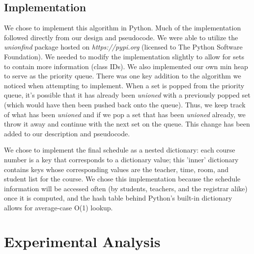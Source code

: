 \documentclass[11pt, oneside]{article}   	%
\begin{document}
\subsection{Implementation}
We chose to implement this algorithm in Python. Much of the implementation followed directly from our design and pseudocode. We were able to utilize the {\it unionfind} package hosted on {\it https://pypi.org} (licensed to The Python Software Foundation). We needed to modify the implementation slightly to allow for sets to contain more information (class IDs). We also implemented our own min heap to serve as the priority queue. There was one key addition to the algorithm we noticed when attempting to implement. When a set is popped from the priority queue, it's possible that it has already been {\it unioned} with a previously popped set (which would have then been pushed back onto the queue). Thus, we keep track of what has been {\it unioned} and if we pop a set that has been {\it unioned} already, we throw it away and continue with the next set on the queue. This change has been added to our description and pseudocode.

We chose to implement the final schedule as a nested dictionary: each course number is a key that corresponds to a dictionary value; this 'inner' dictionary contains keys whose corresponding values are the teacher, time, room, and student list for the course. We chose this implementation because the schedule information will be accessed often (by students, teachers, and the registrar alike) once it is computed, and the hash table behind Python's built-in dictionary allows for average-case O(1) lookup.

\section{Experimental Analysis}
\end{document}
